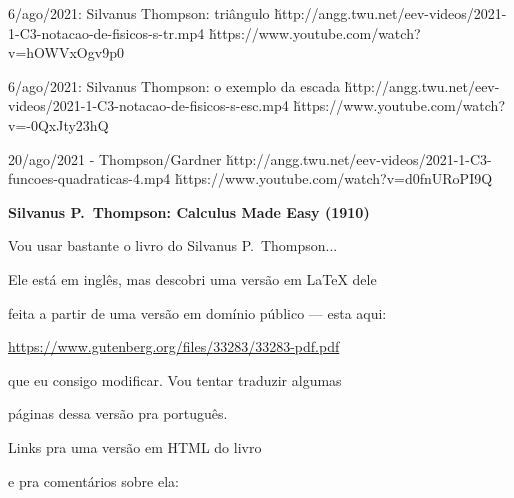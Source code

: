 \documentclass[oneside,12pt]{article}
\begin{document}
{{    \bsk

    6/ago/2021: Silvanus Thompson: triângulo
    \u{http://angg.twu.net/eev-videos/2021-1-C3-notacao-de-fisicos-s-tr.mp4}
    \u{https://www.youtube.com/watch?v=hOWVxOgv9p0}

    \bsk

    6/ago/2021: Silvanus Thompson: o exemplo da escada
    \u{http://angg.twu.net/eev-videos/2021-1-C3-notacao-de-fisicos-s-esc.mp4}
    \u{https://www.youtube.com/watch?v=-0QxJty23hQ}

    \bsk

    20/ago/2021 - Thompson/Gardner
    \u{http://angg.twu.net/eev-videos/2021-1-C3-funcoes-quadraticas-4.mp4}
    \u{https://www.youtube.com/watch?v=d0fnURoPI9Q}



}}


\newpage


{\bf Silvanus P.~Thompson: Calculus Made Easy (1910)}

Vou usar bastante o livro do Silvanus P.~Thompson...

Ele está em inglês, mas descobri uma versão em \LaTeX{} dele 

feita a partir de uma versão em domínio público --- esta aqui:

\ssk

{\footnotesize

\url{https://www.gutenberg.org/files/33283/33283-pdf.pdf}

}

\ssk

que eu consigo modificar. Vou tentar traduzir algumas

páginas dessa versão pra português.

\msk

Links pra uma versão em HTML do livro

e pra comentários sobre ela:

\ssk
\end{document}
